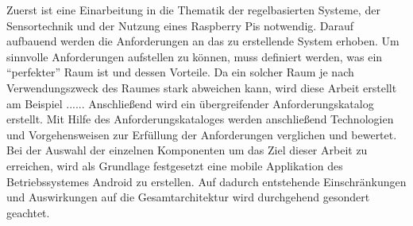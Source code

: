 Zuerst ist eine Einarbeitung in die Thematik der regelbasierten Systeme, der Sensortechnik und der Nutzung eines Raspberry Pis notwendig. Darauf aufbauend werden die Anforderungen an das zu erstellende System erhoben. Um sinnvolle Anforderungen aufstellen zu können, muss definiert werden, was ein ``perfekter'' Raum ist und dessen Vorteile. Da ein solcher Raum je nach Verwendungszweck des Raumes stark abweichen kann, wird diese Arbeit erstellt am Beispiel ...... Anschließend wird ein übergreifender Anforderungskatalog erstellt. Mit Hilfe des Anforderungskataloges werden anschließend Technologien und Vorgehensweisen zur Erfüllung der Anforderungen verglichen und bewertet.\\
Bei der Auswahl der einzelnen Komponenten um das Ziel dieser Arbeit zu erreichen, wird als Grundlage festgesetzt eine mobile Applikation des Betriebssystemes Android zu erstellen. Auf dadurch entstehende Einschränkungen und Auswirkungen auf die Gesamtarchitektur wird durchgehend gesondert geachtet. 	